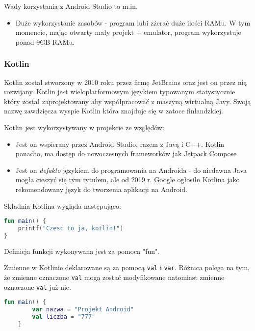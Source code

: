 Wady korzystania z Android Studio to m.in.

\begin{itemize}
	\item Duże wykorzystanie zasobów - program lubi zżerać duże ilości RAMu. W tym momencie, mając otwarty mały projekt + emulator, program wykorzystuje ponad 9GB RAMu. 
\end{itemize}

\subsubsection{Kotlin}

Kotlin został stworzony w 2010 roku przez firmę JetBrains oraz jest on przez nią rozwijany. Kotlin jest wieloplatformowym językiem typowanym statystycznie który został zaprojektowany aby współpracować z maszyną wirtualną Javy. Swoją nazwę zawdzięcza wyspie Kotlin która znajduje się w zatoce finlandzkiej.

Kotlin jest wykorzystywany w projekcie ze względów:

\begin{itemize}
	\item Jest on wspierany przez Android Studio, razem z Javą i C++. Kotlin ponadto, ma dostęp do nowoczesnych frameworków jak Jetpack Compose
	
	\item Jest on \textit{defakto} językiem do programowania na Androida - do niedawna Java mogła cieszyć się tym tytułem, ale od 2019 r. Google ogłosiło Kotlina jako rekomendowany język do tworzenia aplikacji na Android.
\end{itemize}

Składnia Kotlina wygląda następująco:

\begin{lstlisting}[caption=kotlin001 - Funkcje, label={lst:listing-k}, language=kotlin]
fun main() {
	printf("Czesc to ja, kotlin!")
}
\end{lstlisting}
Definicja funkcji wykonywana jest za pomocą "fun".

Zmienne w Kotlinie deklarowane są za pomocą \texttt{val} i \texttt{var}. Różnica polega na tym, że zmienne oznaczone \texttt{val} mogą zostać modyfikowane natomiast zmienne oznaczone \texttt{val} już nie.

\begin{lstlisting}[caption=kotlin002 - Zmienne, label={lst:listing-k}, language=kotlin]
	fun main() {
		var nazwa = "Projekt Android"
		val liczba = "777"
	}
\end{lstlisting}

